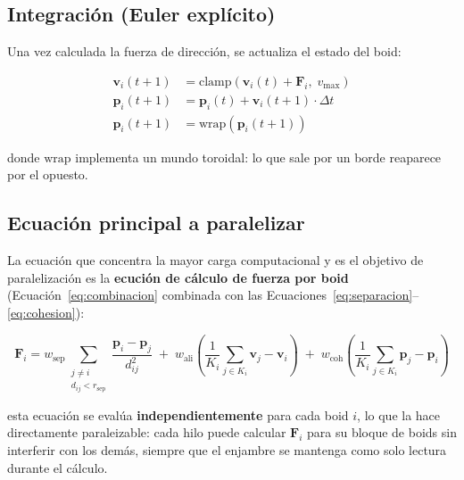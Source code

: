 \documentclass[11pt,a4paper]{article}
\begin{document}
\subsection{Integración (Euler explícito)}
\label{sec:integracion}

Una vez calculada la fuerza de dirección, se actualiza el estado del boid:

\begin{align}
  \mathbf{v}_i(t+1) &= \text{clamp}\left(\mathbf{v}_i(t) + \mathbf{F}_i, \; v_{\text{max}}\right) \label{eq:integrar_velocidad} \\
  \mathbf{p}_i(t+1) &= \mathbf{p}_i(t) + \mathbf{v}_i(t+1) \cdot \Delta t \label{eq:integrar_posicion} \\
  \mathbf{p}_i(t+1) &= \text{wrap}\left(\mathbf{p}_i(t+1)\right) \label{eq:wrap}
\end{align}

\noindent donde $\text{wrap}$ implementa un mundo toroidal: lo que sale por un borde reaparece por el opuesto.

\subsection{Ecuación principal a paralelizar}
\label{sec:ecuacion_principal}

La ecuación que concentra la mayor carga computacional y es el objetivo de paralelización es la \textbf{ecución de cálculo de fuerza por boid} (Ecuación~\ref{eq:combinacion} combinada con las Ecuaciones~\ref{eq:separacion}--\ref{eq:cohesion}):

\begin{equation}
\boxed{
  \mathbf{F}_i = w_{\text{sep}} \sum_{\substack{j \neq i \\ d_{ij} < r_{\text{sep}}}} \frac{\mathbf{p}_i - \mathbf{p}_j}{d_{ij}^2} \;+\; w_{\text{ali}} \left(\frac{1}{K_i}\sum_{j \in K_i} \mathbf{v}_j - \mathbf{v}_i\right) \;+\; w_{\text{coh}} \left(\frac{1}{K_i}\sum_{j \in K_i} \mathbf{p}_j - \mathbf{p}_i\right)
}
\label{eq:principal}
\end{equation}

\noindent esta ecuación se evalúa \textbf{independientemente} para cada boid $i$, lo que la hace directamente paraleizable: cada hilo puede calcular $\mathbf{F}_i$ para su bloque de boids sin interferir con los demás, siempre que el enjambre se mantenga como solo lectura durante el cálculo.

\end{document}
